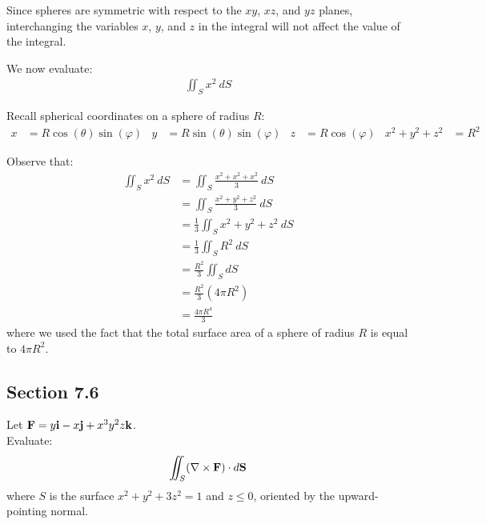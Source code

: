 \begin{solution}
    Since spheres are symmetric with respect to the \(xy\), \(xz\), and \(yz\) planes, interchanging the variables \(x\), \(y\), and \(z\) in the integral will not affect the value of the integral.
    
    We now evaluate:
    \begin{align}
        \iint_S x^2 \ dS
    \end{align}
    
    Recall spherical coordinates on a sphere of radius \(R\):
    \begin{align}
        x &= R\cos(\theta) \sin(\varphi) & y &= R\sin(\theta) \sin(\varphi) & z &= R\cos(\varphi) & x^2 + y^2 + z^2 &= R^2
    \end{align}
    
    Observe that:
    \begin{align*}
        \iint_S x^2 \ dS &= \iint_S \frac{x^2 + x^2 + x^2}{3} \ dS \\
        &= \iint_S \frac{x^2 + y^2 + z^2}{3} \ dS \\
        &= \frac{1}{3} \iint_S x^2 + y^2 + z^2 \ dS \\
        &= \frac{1}{3} \iint_S R^2 \ dS \\
        &= \frac{R^2}{3} \iint_S dS \\
        &= \frac{R^2}{3} (4\pi R^2) \\
        &= \frac{4\pi R^4}{3}
    \end{align*}
    where we used the fact that the total surface area of a sphere of radius \(R\) is equal to \(4\pi R^2\). 
\end{solution}

\subsection{Section 7.6}

\begin{tcolorbox}[
        title={Problem 9},
        valign=center,
        nobeforeafter,
        colframe=gray!95!black
    ]
    Let \(\vb{F} = y\vb{i} - x\vb{j} + x^3y^2z\vb{k}\). \\
    
    Evaluate:
    \begin{align}
        \iint_S (\nabla \times \vb{F}) \cdot d\vb{S}
    \end{align}
    where \(S\) is the surface \(x^2 + y^2 + 3z^2 = 1\) and \(z \leq 0\), oriented by the upward-pointing normal.
\end{tcolorbox}

